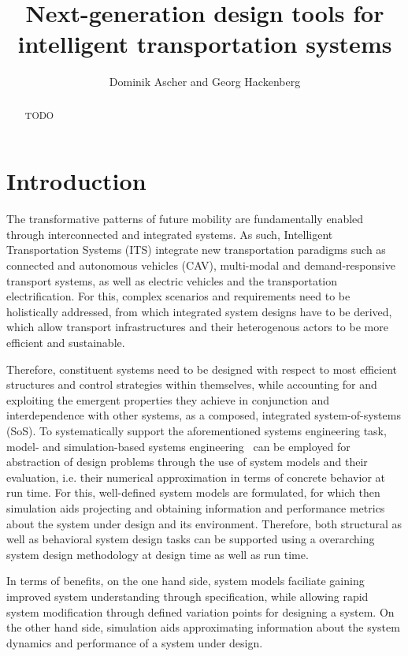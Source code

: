 \documentclass[10pt,twocolumn]{article}
\begin{document}
\title{Next-generation design tools for intelligent transportation systems}
\author{Dominik Ascher and Georg Hackenberg}
\maketitle

\begin{abstract}
    TODO
\end{abstract}

\section{Introduction}
\label{sec:introduction}

The transformative patterns of future mobility are fundamentally enabled through interconnected and integrated systems.
As such, Intelligent Transportation Systems (ITS) integrate new transportation paradigms such as connected and autonomous vehicles (CAV), multi-modal and demand-responsive transport systems, as well as electric vehicles and the transportation electrification. For this, complex scenarios and requirements need to be holistically addressed, from which integrated system designs have to be derived, which allow transport infrastructures and their heterogenous actors to be more efficient and sustainable.

Therefore, constituent systems need to be designed with respect to most efficient structures and control strategies within themselves, while accounting for and exploiting the emergent properties they achieve in conjunction and interdependence with other systems, as a composed, integrated system-of-systems (SoS). To systematically support the aforementioned systems engineering task, model- and simulation-based systems engineering~\cite{gianni2014modeling} can be employed for abstraction of design problems through the use of system models and their evaluation, i.e. their numerical approximation in terms of concrete behavior at run time. For this, well-defined system models are formulated, for which then simulation aids projecting and obtaining information and performance metrics about the system under design and its environment. Therefore, both structural as well as behavioral system design tasks can be supported using a overarching system design methodology at design time as well as run time.

In terms of benefits, on the one hand side, system models faciliate gaining improved system understanding through specification, while allowing rapid system modification through defined variation points for designing a system. On the other hand side, simulation aids approximating information about the system dynamics and performance of a system under design.
\end{document}
